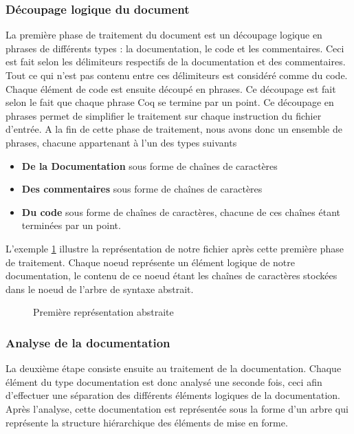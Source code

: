 \documentclass[a4paper, 11pt]{report}
\begin{document}
    \subsubsection{Découpage logique du document}
    La première phase de traitement du document est un découpage logique
    en phrases de différents types : la documentation, le code et les
    commentaires.
    Ceci est fait selon les délimiteurs respectifs de la documentation et
    des commentaires. Tout ce qui n'est pas contenu entre ces délimiteurs
    est considéré comme du code.
    Chaque élément de code est ensuite découpé en phrases. Ce découpage est
    fait selon le fait que chaque phrase Coq se termine par un point. Ce
    découpage en phrases permet de simplifier le traitement sur chaque
    instruction du fichier d'entrée.
    A la fin de cette phase de traitement, nous avons donc un ensemble
    de phrases, chacune appartenant à l'un des types suivants
    \begin{itemize}
      \item \textbf{De la Documentation} sous forme de chaînes de caractères
      \item \textbf{Des commentaires} sous forme de chaînes de caractères
      \item \textbf{Du code} sous forme de chaînes de caractères, chacune
        de ces chaînes étant terminées par un point.
    \end{itemize}

    L'exemple \cref{ast1} illustre la représentation de notre fichier après
    cette première phase de traitement. Chaque noeud représente un élément
    logique de notre documentation, le contenu de ce noeud étant les chaînes
    de caractères stockées dans le noeud de l'arbre de syntaxe abstrait.
    \begin{figure}
      \caption{Première représentation abstraite}
      \label{ast1}
    \end{figure}
    \clearpage
    \subsubsection{Analyse de la documentation}
    La deuxième étape consiste ensuite au traitement de la documentation.
    Chaque élément du type documentation est donc analysé une seconde fois,
    ceci afin d'effectuer une séparation des différents éléments logiques
    de la documentation. Après l'analyse, cette documentation est représentée
    sous la forme d'un arbre qui représente la structure hiérarchique des
    éléments de mise en forme.
\end{document}
